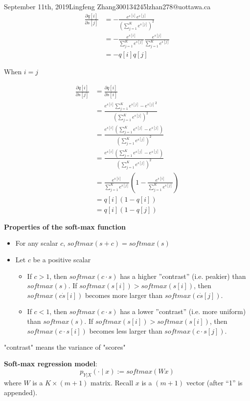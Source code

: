 \documentclass{article}
\begin{document}
\begin{lecture}{September 11th, 2019}{Lingfeng Zhang}{300134245}{lzhan278@uottawa.ca}
\begin{align*}
\frac{\partial q[i]}{\partial s[j]} &= - \frac{e^{s[i]}e^{s[j]}}{(\sum_{j=1}^K e^{s[j]})^2} \\
&= - \frac{e^{s[i]}}{\sum_{j=1}^K e^{s[j]}} \frac{e^{s[j]}}{\sum_{j=1}^K e^{s[j]}} \\
&= -q[i]q[j]
\end{align*}

When $i=j$

\begin{align*}
\frac{\partial q[i]}{\partial s[j]} &= \frac{\partial q[i]}{\partial s[i]} \\
&= \frac{e^{s[i]}\sum_{j=1}^K e^{s[j]}-{e^{s[j]}}^2}{(\sum_{j=1}^K e^{s[j]})^2} \\
&= \frac{e^{s[i]} (\sum_{j=1}^K e^{s[j]}-e^{s[j]})}{(\sum_{j=1}^K e^{s[j]})^2} \\
&= \frac{e^{s[i]} (\sum_{j=1}^K e^{s[j]}-e^{s[j]})}{(\sum_{j=1}^K e^{s[j]})^2} \\
&= \frac{e^{s[i]}}{\sum_{j=1}^K e^{s[j]}} \left( 1-\frac{e^{s[i]}}{\sum_{j=1}^K e^{s[j]}} \right) \\
&= q[i](1-q[i]) \\
&= q[i](1-q[j])
\end{align*}

\textbf{Properties of the soft-max function}
            \begin{itemize}
                \item For any scalar $c$, $softmax(s+c)=softmax(s)$
                \item Let $c$ be a positive scalar
                \begin{itemize}
                    \item If $c>1$, then $softmax(c \cdot s)$ has a higher ''contrast'' (i.e. peakier) than $softmax(s)$.  If $softmax(s[i]) > softmax(s[i])$,  then $softmax(c \dot s[i])$ becomes more larger than $softmax(c \dot s[j])$.
                    \item If $c<1$, then $softmax(c \cdot s)$ has a lower ''contrast'' (i.e. more uniform) than $softmax(s)$.  If $softmax(s[i]) > softmax(s[i])$,  then $softmax(c \cdot s[i])$ becomes less larger than $softmax(c \cdot s[j])$.
                \end{itemize}
            \end{itemize}
            
"contrast" means the variance of "scores"


            \textbf{Soft-max regression model}:
            \[
                p_{Y|X}(\cdot \mid  x) := softmax(Wx)
            \]
            where $W$ is a $K \times (m+1)$ matrix. Recall $x$ is a $(m+1)$ vector (after ``1'' is appended).


\end{lecture}
\end{document}
